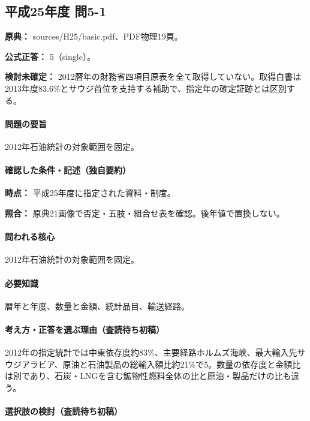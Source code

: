 \subsection{平成25年度 問5-1}
\label{q:h25-reg-basic-5-1}

\noindent\textbf{原典：} sources/H25/basic.pdf、PDF物理19頁。

\textbf{公式正答：} 5（single）。

\par\textbf{検討未確定：} 2012暦年の財務省四項目原表を全て取得していない。取得白書は2013年度83.6\%とサウジ首位を支持する補助で、指定年の確定証跡とは区別する。

\paragraph{問題の要旨} 2012年石油統計の対象範囲を固定。

\paragraph{確認した条件・記述（独自要約）}\mbox{}\par

\noindent\textbf{時点：} 平成25年度に指定された資料・制度。\par

\noindent\textbf{照合：} 原典21画像で否定・五肢・組合せ表を確認。後年値で置換しない。\par

\paragraph{問われる核心} 2012年石油統計の対象範囲を固定。

\paragraph{必要知識} 暦年と年度、数量と金額、統計品目、輸送経路。

\paragraph{考え方・正答を選ぶ理由（査読待ち初稿）} 2012年の指定統計では中東依存度約83\%、主要経路ホルムズ海峡、最大輸入先サウジアラビア、原油と石油製品の総輸入額比約21\%で5。数量の依存度と金額比は別であり、石炭・LNGを含む鉱物性燃料全体の比と原油・製品だけの比も違う。

\paragraph{選択肢の検討（査読待ち初稿）}\mbox{}\par

